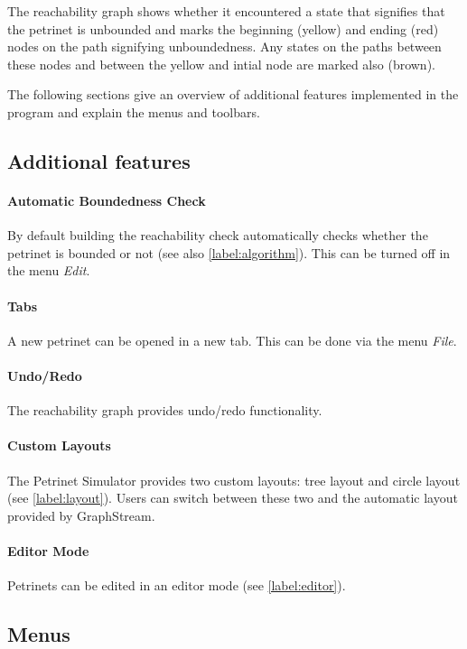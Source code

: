 \documentclass[10pt, a4paper]{article}
\begin{document}
The reachability graph shows whether it encountered a state that signifies that the petrinet is unbounded and marks the beginning (yellow) and ending (red) nodes on the path signifying unboundedness. Any states on the paths between these nodes and between the yellow and intial node are marked also (brown).

The following sections give an overview of additional features implemented in the program and explain the menus and toolbars.

\subsection{Additional features}

\paragraph{Automatic Boundedness Check} By default building the reachability check automatically checks whether the petrinet is bounded or not (see also \ref{label:algorithm}). This can be turned off in the menu \textit{Edit}.

\paragraph{Tabs} A new petrinet can be opened in a new tab. This can be done via the menu \textit{File}.

\paragraph{Undo/Redo} The reachability graph provides undo/redo functionality.

\paragraph{Custom Layouts} The Petrinet Simulator provides two custom layouts: tree layout and circle layout (see \ref{label:layout}). Users can switch between these two and the automatic layout provided by GraphStream.

\paragraph{Editor Mode} Petrinets can be edited in an editor mode (see \ref{label:editor}).


\subsection{Menus}
\end{document}
